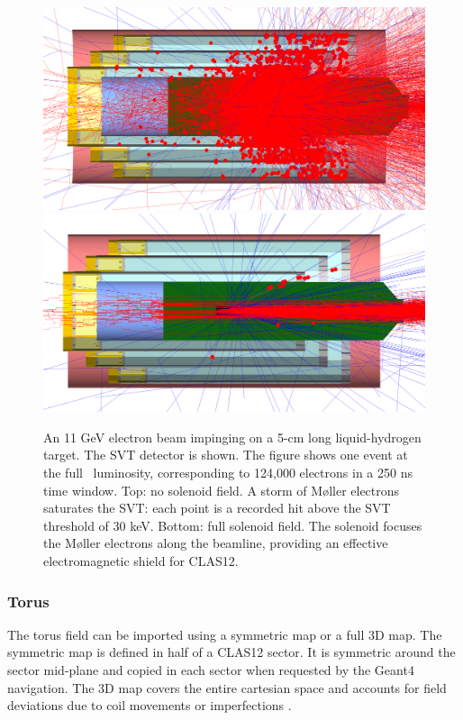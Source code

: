 \begin{figure}
	\centering
	\includegraphics[width=0.98\columnwidth,keepaspectratio]{img/solenoidOFF.png}
	\includegraphics[width=0.98\columnwidth,keepaspectratio]{img/solenoidON.png}
    \caption{An 11 GeV electron beam impinging on a 5-cm long liquid-hydrogen target. The SVT detector is shown.
             The figure shows one event at the full \cLuminosity\ luminosity, corresponding to 124,000 electrons in a 250 ns time window.
			 Top: no solenoid field. A storm of M\o ller electrons saturates the SVT: each point is a recorded hit above the SVT threshold of 30 keV.
			 Bottom: full solenoid field.
             The solenoid focuses the M\o ller electrons along the beamline, providing an effective electromagnetic shield for CLAS12. }
	\label{fig:solenoidONOFF}
\end{figure}

\subsubsection{Torus}
The torus field can be imported using a symmetric map or a full 3D map.
The symmetric map is defined in half of a CLAS12 sector. It is symmetric around the sector mid-plane and copied in each sector
when requested by the Geant4 navigation. The 3D map covers the entire cartesian space and accounts for field deviations due to coil
movements or imperfections \cite{GhoshalSolenoid}.

